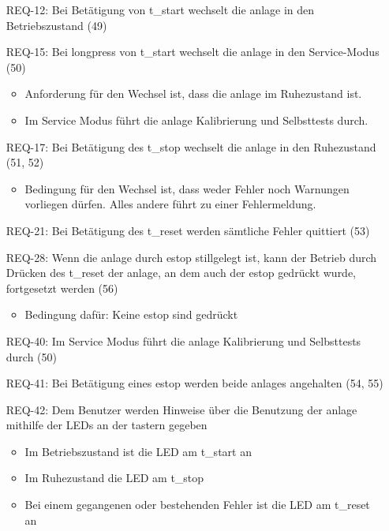 \begin{itemize}
    \item[REQ-12:] Bei Betätigung von \gls{t_start} wechselt die \gls{anlage} in den Betriebszustand (49)
    \item[REQ-15:] Bei \gls{longpress} von \gls{t_start} wechselt die \gls{anlage} in den Service-Modus (50)
    \begin{itemize}
        \item Anforderung für den Wechsel ist, dass die \gls{anlage} im Ruhezustand ist.
        \item Im Service Modus führt die \gls{anlage} Kalibrierung und Selbsttests durch. %
    \end{itemize}
    \item[REQ-17:] Bei Betätigung des \gls{t_stop} wechselt die \gls{anlage} in den Ruhezustand (51, 52)
    \begin{itemize}
        \item Bedingung für den Wechsel ist, dass weder Fehler noch Warnungen vorliegen dürfen. %
        Alles andere führt zu einer Fehlermeldung.
    \end{itemize}
    \item[REQ-21:] Bei Betätigung des \gls{t_reset} werden sämtliche Fehler quittiert (53) %
    \item[REQ-28:] Wenn die \gls{anlage} durch \gls{estop} stillgelegt ist, kann der Betrieb durch Drücken des
    \gls{t_reset} der \gls{anlage}, an dem auch der \gls{estop} gedrückt wurde, fortgesetzt werden (56) %
    \begin{itemize}
        \item Bedingung dafür: Keine \gls{estop} sind gedrückt
    \end{itemize}
    \item[REQ-40:] Im Service Modus führt die \gls{anlage} Kalibrierung und Selbsttests durch (50) %
    \item[REQ-41:] Bei Betätigung eines \gls{estop} werden beide \glspl{anlage} angehalten (54, 55)
    \item[REQ-42:] Dem Benutzer werden Hinweise über die Benutzung der \gls{anlage} mithilfe der LEDs an der \gls{taster}n gegeben
    \begin{itemize}
        \item Im Betriebszustand ist die LED am \gls{t_start} an
        \item Im Ruhezustand die LED am \gls{t_stop}
        \item Bei einem gegangenen oder bestehenden Fehler ist die LED am \gls{t_reset} an
    \end{itemize}
\end{itemize}

